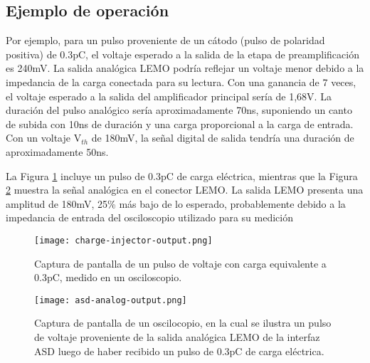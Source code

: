 \subsection{Ejemplo de operación}

Por ejemplo, para un pulso proveniente de un cátodo (pulso de polaridad positiva) de 0.3pC, el voltaje esperado a la salida de la etapa de preamplificación es 240mV. La salida analógica LEMO podría reflejar un voltaje menor debido a la impedancia de la carga conectada para su lectura. Con una ganancia de 7 veces, el voltaje esperado a la salida del amplificador principal sería de 1,68V. La duración del pulso analógico sería aproximadamente 70ns, suponiendo un canto de subida con 10ns de duración y una carga proporcional a la carga de entrada. Con un voltaje V$_{th}$ de 180mV, la señal digital de salida tendría una duración de aproximadamente 50ns.

La Figura \ref{img:charge-injector-output} incluye un pulso de 0.3pC de carga eléctrica, mientras que la Figura \ref{img:asd-analog-output} muestra la señal analógica en el conector LEMO. La salida LEMO presenta una amplitud de 180mV, 25\% más bajo de lo esperado, probablemente debido a la impedancia de entrada del osciloscopio utilizado para su medición

\begin{figure}[h]
	\centering
	\texttt{[image: charge-injector-output.png]}
	\caption{Captura de pantalla de un pulso de voltaje con carga equivalente a 0.3pC, medido en un osciloscopio.}
	\label{img:charge-injector-output}
\end{figure}

\begin{figure}[h]
	\centering
	\texttt{[image: asd-analog-output.png]}
	\caption{Captura de pantalla de un oscilocopio, en la cual se ilustra un pulso de voltaje proveniente de la salida analógica LEMO de la interfaz ASD luego de haber recibido un pulso de 0.3pC de carga eléctrica.}
	\label{img:asd-analog-output}
\end{figure}


